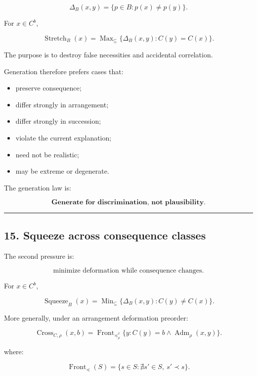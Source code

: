 \documentclass[
]{article}
\providecommand{\tightlist}{%
  \setlength{\itemsep}{0pt}\setlength{\parskip}{0pt}}
\begin{document}
\[
\Delta_B(x,y)
=
\{p\in B:p(x)\neq p(y)\}.
\]

For \(x\in C^b\),

\[
\boxed{
\operatorname{Stretch}_B(x)
=
\operatorname{Max}_{\subseteq}
\{
\Delta_B(x,y):
C(y)=C(x)
\}.
}
\]

The purpose is to destroy false necessities and accidental correlation.

Generation therefore prefers cases that:

\begin{itemize}
\tightlist
\item
  preserve consequence;
\item
  differ strongly in arrangement;
\item
  differ strongly in succession;
\item
  violate the current explanation;
\item
  need not be realistic;
\item
  may be extreme or degenerate.
\end{itemize}

The generation law is:

\[
\boxed{
\textbf{Generate for discrimination, not plausibility.}
}
\]

\begin{center}\rule{0.5\linewidth}{0.5pt}\end{center}

\subsection{15. Squeeze across consequence
classes}\label{squeeze-across-consequence-classes}

The second pressure is:

\[
\boxed{
\text{minimize deformation while consequence changes.}
}
\]

For \(x\in C^b\),

\[
\boxed{
\operatorname{Squeeze}_B(x)
=
\operatorname{Min}_{\subseteq}
\{
\Delta_B(x,y):
C(y)\neq C(x)
\}.
}
\]

More generally, under an arrangement deformation preorder:

\[
\boxed{
\operatorname{Cross}_{C,\rho}(x,b)
=
\operatorname{Front}_{\preceq_\rho^x}
\{
y:
C(y)=b
\land
\operatorname{Adm}_\rho(x,y)
\}.
}
\]

where:

\[
\operatorname{Front}_{\preceq}(S)
=
\{s\in S:\nexists s'\in S,\ s'\prec s\}.
\]
\end{document}
